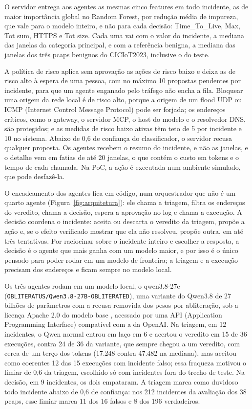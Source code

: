 O servidor entrega aos agentes as mesmas cinco features em todo incidente, as de maior importância global no Random Forest, por redução média de impureza, que vale para o modelo inteiro, e não para cada decisão: Time\_To\_Live, Max, Tot sum, HTTPS e Tot size. Cada uma vai com o valor do incidente, a mediana das janelas da categoria principal, e com a referência benigna, a mediana das janelas dos três pcaps benignos do CICIoT2023, inclusive o do teste.

A política de risco aplica sem aprovação as ações de risco baixo e deixa as de risco alto à espera de uma pessoa, com no máximo 10 propostas pendentes por incidente, para que um agente enganado pelo tráfego não encha a fila. Bloquear uma origem da rede local é de risco alto, porque a origem de um flood UDP ou ICMP (Internet Control Message Protocol) pode ser forjada; os endereços críticos, como o gateway, o servidor MCP, o host do modelo e o resolvedor DNS, são protegidos; e as medidas de risco baixo ativas têm teto de 5 por incidente e 10 no sistema. Abaixo de 0,6 de confiança do classificador, o servidor recusa qualquer proposta. Os agentes recebem o resumo do incidente, e não as janelas, e o detalhe vem em fatias de até 20 janelas, o que contém o custo em tokens e o tempo de cada chamada. Na PoC, a ação é executada num ambiente simulado, que pode desfazê-la.

O encadeamento dos agentes fica em código, num orquestrador que não é um quarto agente (Figura~\ref{fig:arquitetura}): ele chama a triagem, filtra os endereços do veredito, chama a decisão, espera a aprovação no log e chama a execução. A decisão coordena o incidente: aceita ou descarta o veredito da triagem, propõe a ação e, se o efeito verificado mostrar que ela não resolveu, propõe outra, em até três tentativas. Por raciocinar sobre o incidente inteiro e escolher a resposta, a decisão é o agente que mais ganha com um modelo maior, e por isso é o único pensado para poder rodar em um modelo de fronteira; a triagem e a execução precisam dos endereços e ficam sempre no modelo local.

Os três agentes rodam em um modelo local, o qwen3.8-27c (\nolinkurl{OBLITERATUS/Qwen3.8-27B-OBLITERATED}), uma variante do Qwen3.8 de 27 bilhões de parâmetros com a recusa removida dos pesos por abliteração, sob a licença Apache 2.0 do modelo base \cite{obliteratus2026}, acessado por uma API (Application Programming Interface) compatível com a da OpenAI. Na triagem, em 12 incidentes, o Qwen normal entrou em laço em 6 e acertou o veredito em 15 de 36 execuções, contra 24 de 36 da variante, que sempre chegou a um veredito, com cerca de um terço dos tokens (17.248 contra 47.482 na mediana), mas aceitou como coerentes 12 das 15 execuções com incidente falso; essa fraqueza motivou o limiar de 0,6 da triagem, escolhido só com incidentes fora do trecho de teste. Na decisão, em 9 incidentes, os dois empataram. A triagem marca como duvidoso todo incidente abaixo de 0,6 de confiança: nos 212 incidentes da avaliação dos 38 pcaps, esse limiar marca 11 dos 16 falsos e 8 dos 196 verdadeiros.

